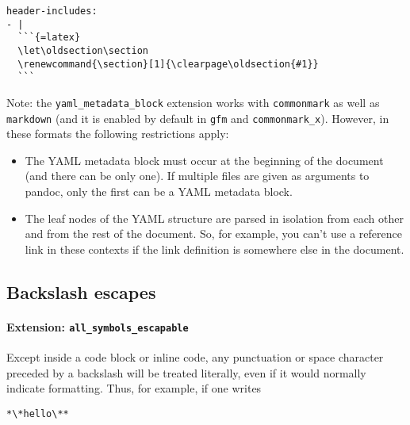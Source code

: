 \begin{verbatim}
header-includes:
- |
  ```{=latex}
  \let\oldsection\section
  \renewcommand{\section}[1]{\clearpage\oldsection{#1}}
  ```
\end{verbatim}

Note: the \texttt{yaml\_metadata\_block} extension works with
\texttt{commonmark} as well as \texttt{markdown} (and it is enabled by
default in \texttt{gfm} and \texttt{commonmark\_x}). However, in these
formats the following restrictions apply:

\begin{itemize}
\item
  The YAML metadata block must occur at the beginning of the document
  (and there can be only one). If multiple files are given as arguments
  to pandoc, only the first can be a YAML metadata block.
\item
  The leaf nodes of the YAML structure are parsed in isolation from each
  other and from the rest of the document. So, for example, you can't
  use a reference link in these contexts if the link definition is
  somewhere else in the document.
\end{itemize}

\hypertarget{backslash-escapes}{%
\subsection{Backslash escapes}\label{backslash-escapes}}

\hypertarget{extension-all_symbols_escapable}{%
\paragraph{\texorpdfstring{Extension:
\texttt{all\_symbols\_escapable}}{Extension: all\_symbols\_escapable}}\label{extension-all_symbols_escapable}}

Except inside a code block or inline code, any punctuation or space
character preceded by a backslash will be treated literally, even if it
would normally indicate formatting. Thus, for example, if one writes

\begin{verbatim}
*\*hello\**
\end{verbatim}

